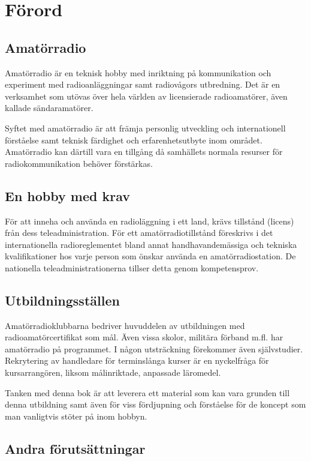 \chapter*{Förord}
\section*{Amatörradio}
Amatörradio är en teknisk hobby med inriktning på kommunikation och experiment
med radioanläggningar samt radiovågors utbredning. Det är en verksamhet som
utövas över hela världen av licensierade radioamatörer, även kallade
sändaramatörer.

Syftet med amatörradio är att främja personlig utveckling och internationell
förståelse samt teknisk färdighet och erfarenhetsutbyte inom området.
Amatörradio kan därtill vara en tillgång då samhällets normala resurser för
radiokommunikation behöver förstärkas.

\section*{En hobby med krav}

För att inneha och använda en radioläggning i ett land, krävs tillstånd (licens)
från dess teleadministration. För ett amatörradiotillstånd föreskrivs 
i det internationella radioreglementet bland annat handhavandemässiga och 
tekniska kvalifikationer hos varje person som önskar använda en 
amatörradiostation. De nationella teleadministrationerna tillser detta genom 
kompetensprov.

\section*{Utbildningsställen}

Amatörradioklubbarna bedriver huvuddelen av utbildningen med
radioamatörcertifikat som mål. Även vissa skolor, militära förband m.fl. har
amatörradio på programmet. I någon utsträckning förekommer även självstudier.
Rekrytering av handledare för terminslånga kurser är en nyckelfråga för
kursarrangören, liksom målinriktade, anpassade läromedel.

\begin{rev-nytt}
Tanken med denna bok är att leverera ett material som kan vara grunden till 
denna utbildning samt även för viss fördjupning och förståelse för de koncept 
som man vanligtvis stöter på inom hobbyn.
\end{rev-nytt}

\section*{Andra förutsättningar}

